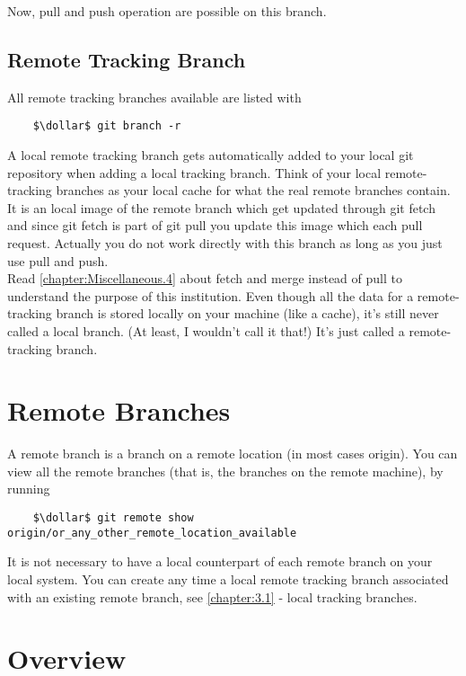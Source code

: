 Now, pull and push operation are possible on this branch.



\subsection*{Remote Tracking Branch}


All remote tracking branches available are listed with
\begin{lstlisting}
	$\dollar$ git branch -r
\end{lstlisting}

A local remote tracking branch gets automatically added to your local git repository when adding a 
local tracking branch. Think of your local remote-tracking branches as your local cache for what the real remote branches contain.
It is an local image of the remote branch which get updated through git fetch and since 
git fetch is part of git pull you update this image which each pull request. Actually you do not work directly with this branch as long as you just use 
pull and push.
\\
Read \cref{chapter:Miscellaneous.4} about fetch and merge instead of pull to understand the purpose of this institution.
Even though all the data for a remote-tracking branch is stored locally on your machine (like a cache), it's still never called a local branch. 
(At least, I wouldn't call it that!) It's just called a remote-tracking branch.



\section{Remote Branches}
\label{chapter:3.2}

A remote branch is a branch on a remote location (in most cases origin). 
You can view all the remote branches (that is, the branches on the remote machine), by running 

\begin{lstlisting}
	$\dollar$ git remote show origin/or_any_other_remote_location_available
\end{lstlisting}

It is not necessary to have a local counterpart of each remote branch on your local system. You can create any time
a local remote tracking branch associated with an existing remote branch, see \cref{chapter:3.1} - local tracking branches.

\section{Overview}
\label{chapter:3.3}

